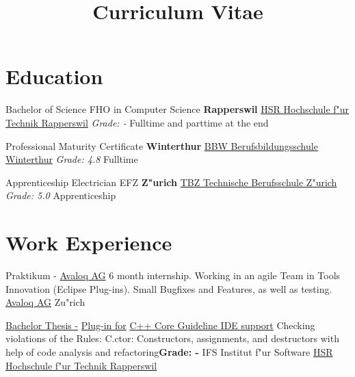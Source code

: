 \documentclass[11pt,legalpaper,sans]{moderncv}
\title{Curriculum Vitae}
\begin{document}
\makecvtitle

\section{Education}
{Bachelor of Science FHO in Computer Science}
{\hfill\bfseries Rapperswil}
{\newline{}\href{http://www.hsr.ch/}{HSR Hochschule f"ur Technik Rapperswil}}
{\hfill\textit{Grade: -}}
{Fulltime and parttime at the end}

{Professional Maturity Certificate}
{\hfill\bfseries Winterthur}
{\newline{}\href{http://www.bbw.ch/}{BBW Berufsbildungsschule Winterthur}}
{\hfill\textit{Grade: 4.8}}
{Fulltime}

{Apprenticeship Electrician EFZ}
{\hfill\bfseries Z"urich}
{\newline{}\href{htttp://www.tbz.ch/}{TBZ Technische Berufsschule Z"urich}}
{\hfill\textit{Grade: 5.0}}
{Apprenticeship}

\section{Work Experience}
{Praktikum - \href{https://www.avaloq.ch/}{Avaloq AG}}{}
{\newline{}6 month internship. Working in an agile Team in Tools Innovation (Eclipse Plug-ins). Small Bugfixes and Features, as well as testing.}{}
{\href{https://www.avaloq.ch/}{Avaloq AG} \hfill Zu"rich}

{\href{http://sinv-56012.edu.hsr.ch/ccglator}{Bachelor Thesis -} \href{https://www.youtube.com/watch?v=CeNdN5KlPGc}{Plug-in for} \href{https://github.com/isocpp/CppCoreGuidelines/blob/master/CppCoreGuidelines.md}{C++ Core Guideline IDE support}}{}
{\newline{}Checking violations of the Rules: C.ctor: Constructors, assignments, and destructors with help of  code analysis and refactoring}{\hfill \textbf{Grade: -}}
{IFS Institut f"ur Software \hfill\href{http://www.hsr.ch/}{HSR Hochschule f"ur Technik Rapperswil}}
\end{document}
